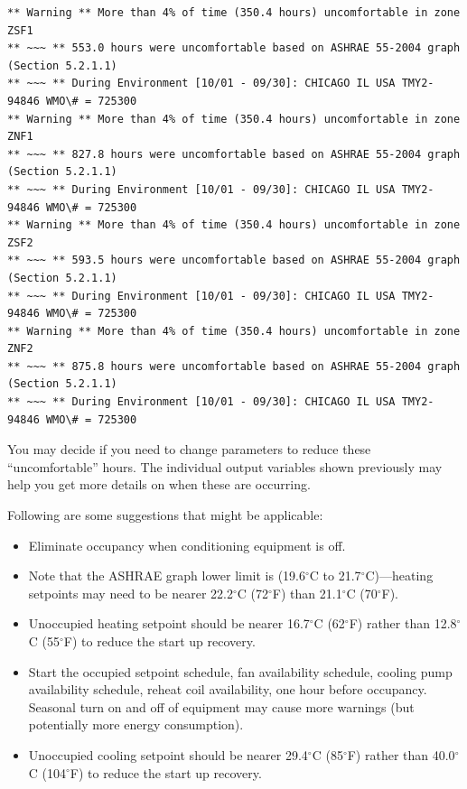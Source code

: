 \begin{lstlisting}
** Warning ** More than 4% of time (350.4 hours) uncomfortable in zone ZSF1
** ~~~ ** 553.0 hours were uncomfortable based on ASHRAE 55-2004 graph (Section 5.2.1.1)
** ~~~ ** During Environment [10/01 - 09/30]: CHICAGO IL USA TMY2-94846 WMO\# = 725300
** Warning ** More than 4% of time (350.4 hours) uncomfortable in zone ZNF1
** ~~~ ** 827.8 hours were uncomfortable based on ASHRAE 55-2004 graph (Section 5.2.1.1)
** ~~~ ** During Environment [10/01 - 09/30]: CHICAGO IL USA TMY2-94846 WMO\# = 725300
** Warning ** More than 4% of time (350.4 hours) uncomfortable in zone ZSF2
** ~~~ ** 593.5 hours were uncomfortable based on ASHRAE 55-2004 graph (Section 5.2.1.1)
** ~~~ ** During Environment [10/01 - 09/30]: CHICAGO IL USA TMY2-94846 WMO\# = 725300
** Warning ** More than 4% of time (350.4 hours) uncomfortable in zone ZNF2
** ~~~ ** 875.8 hours were uncomfortable based on ASHRAE 55-2004 graph (Section 5.2.1.1)
** ~~~ ** During Environment [10/01 - 09/30]: CHICAGO IL USA TMY2-94846 WMO\# = 725300
\end{lstlisting}

You may decide if you need to change parameters to reduce these ``uncomfortable'' hours. The individual output variables shown previously may help you get more details on when these are occurring.

Following are some suggestions that might be applicable:

\begin{itemize}
\item
  Eliminate occupancy when conditioning equipment is off.
\item
  Note that the ASHRAE graph lower limit is (19.6$^\circ$C to 21.7$^\circ$C)---heating setpoints may need to be nearer 22.2$^\circ$C (72$^\circ$F) than 21.1$^\circ$C (70$^\circ$F).
\item
  Unoccupied heating setpoint should be nearer 16.7$^\circ$C (62$^\circ$F) rather than 12.8$^\circ$C (55$^\circ$F) to reduce the start up recovery.
\item
  Start the occupied setpoint schedule, fan availability schedule, cooling pump availability schedule, reheat coil availability, one hour before occupancy. Seasonal turn on and off of equipment may cause more warnings (but potentially more energy consumption).
\item
  Unoccupied cooling setpoint should be nearer 29.4$^\circ$C (85$^\circ$F) rather than 40.0$^\circ$C (104$^\circ$F) to reduce the start up recovery.
\end{itemize}

